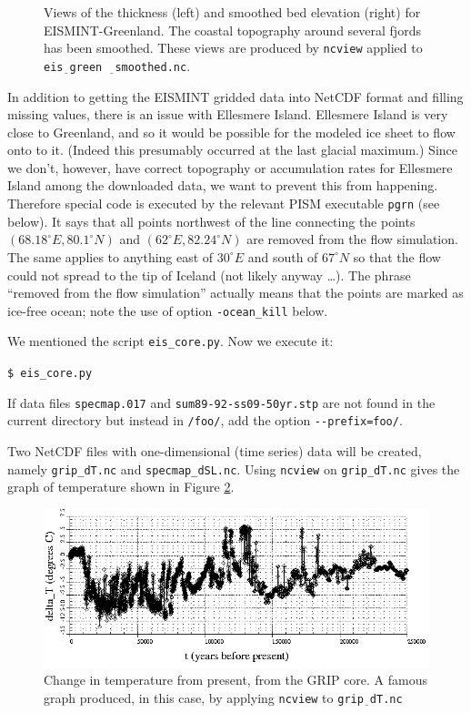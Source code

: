 \documentclass[11pt,final]{amsart}
\newcommand{\und}{$\underline{\,\,\,}$}
\begin{document}
\begin{figure}[ht]
\caption{Views of the thickness (left) and smoothed bed elevation (right) for EISMINT-Greenland.  The coastal topography around several fjords has been smoothed.  These views are produced by \texttt{ncview} applied to \texttt{eis\und green \und smoothed.nc}.}
\label{fig:greendata}
\end{figure}

In addition to getting the EISMINT gridded data into NetCDF format and filling missing values, there is an issue with Ellesmere Island.  Ellesmere Island is very close to Greenland, and so it would be possible for the modeled ice sheet to flow onto to it.  (Indeed this presumably occurred at the last glacial maximum.)  Since we don't, however, have correct topography or accumulation rates for Ellesmere Island among the downloaded data, we want to prevent this from happening.  Therefore special code is executed by the relevant PISM executable \verb|pgrn| (see below).  It says that all points northwest of the line connecting the points $(68.18^\circ E, 80.1^\circ N)$ and $(62^\circ E, 82.24^\circ N)$ are removed from the flow simulation.  The same applies to anything east of $30^\circ E$ and south of $67^\circ N$ so that the flow could not spread to the tip of Iceland (not likely anyway \dots).  The phrase ``removed from the flow simulation'' actually means that the points are marked as ice-free ocean; note the use of option \verb|-ocean_kill| below.

We mentioned the script \verb|eis_core.py|.  Now we execute it:

\verb|$ eis_core.py|

\noindent If data files \verb|specmap.017| and \verb|sum89-92-ss09-50yr.stp| are not found in the current directory but instead in \verb|/foo/|, add the option \verb|--prefix=foo/|.

Two NetCDF files with one-dimensional (time series) data will be created, namely \verb|grip_dT.nc| and \verb|specmap_dSL.nc|.  Using \verb|ncview| on \verb|grip_dT.nc| gives the graph of temperature  shown in Figure \ref{fig:gripDeltaT}.

\begin{figure}[ht]
\includegraphics[width=5.6in,keepaspectratio=true]{figs/gripDeltaT}
\caption{Change in temperature from present, from the GRIP core.  A famous graph produced, in this case, by applying \texttt{ncview} to \texttt{grip\und dT.nc}}
\label{fig:gripDeltaT}
\end{figure}
\end{document}
